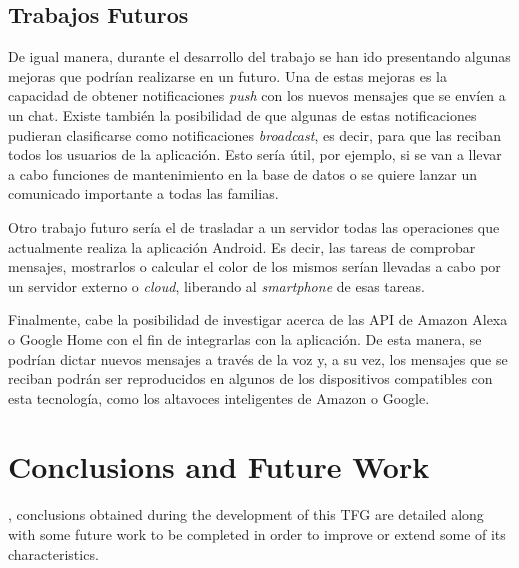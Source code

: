 \clearpage

\section{Trabajos Futuros}
De igual manera, durante el desarrollo del trabajo se han ido presentando algunas mejoras que podrían realizarse en un futuro. Una de estas mejoras es la capacidad de obtener notificaciones \textit{push} con los nuevos mensajes que se envíen a un chat. Existe también la posibilidad de que algunas de estas notificaciones pudieran clasificarse como notificaciones \textit{broadcast}, es decir, para que las reciban todos los usuarios de la aplicación. Esto sería útil, por ejemplo, si se van a llevar a cabo funciones de mantenimiento en la base de datos o se quiere lanzar un comunicado importante a todas las familias.

Otro trabajo futuro sería el de trasladar a un servidor todas las operaciones que actualmente realiza la aplicación Android. Es decir, las tareas de comprobar mensajes, mostrarlos o calcular el color de los mismos serían llevadas a cabo por un servidor externo o \textit{cloud}, liberando al \textit{smartphone} de esas tareas.

Finalmente, cabe la posibilidad de investigar acerca de las \acs{API} de Amazon Alexa o Google Home con el fin de integrarlas con la aplicación. De esta manera, se podrían dictar nuevos mensajes a través de la voz y, a su vez, los mensajes que se reciban podrán ser reproducidos en algunos de los dispositivos compatibles con esta tecnología, como los altavoces inteligentes de Amazon o Google.

\chapter{Conclusions and Future Work}
, conclusions obtained during the development of this \acs{TFG} are detailed along with some future work to be completed in order to improve or extend some of its \mbox{characteristics}.


